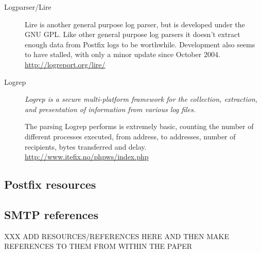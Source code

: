\documentclass[a4paper,12pt,draft]{article}
\begin{document}
\begin{description}
    \item [Logparser/Lire] Lire is another general purpose log parser, but
        is developed under the GNU GPL\@.  Like other general purpose log
        parsers it doesn't extract enough data from Postfix logs to be
        worthwhile.  Development also seems to have stalled, with only a
        minor update since October 2004.  \newline
        \url{http://logreport.org/lire/}

    \item [Logrep] \textit{Logrep is a secure multi-platform framework for
        the collection, extraction, and presentation of information from
        various log files.\/}

        The parsing Logrep performs is extremely basic, counting the number
        of different processes executed, from address, to addresses, number
        of recipients, bytes transferred and delay.  \newline
        \url{http://www.itefix.no/phpws/index.php}

\end{description}

\subsection{Postfix resources}

\subsection{SMTP references}

XXX ADD RESOURCES/REFERENCES HERE AND THEN MAKE REFERENCES TO THEM FROM WITHIN THE PAPER
\end{document}
